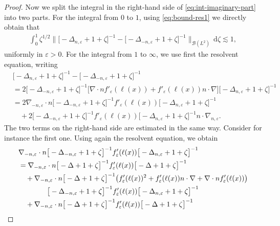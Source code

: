 \documentclass[12pt]{article}
\theoremstyle{plain}
\begin{document}
\begin{proof}
Now we split the integral in the right-hand side of \eqref{eq:int-imaginary-part} into two parts. For the integral from $0$ to $1$, using \eqref{eq:bound-res1} we directly obtain that
\begin{align}
    \int_0^1 \zeta^{1/2}\Big\|\big[-\Delta_{n,\varepsilon}+1+\zeta\big]^{-1}-\big[-\Delta_{- n,\varepsilon}+1+\zeta\big]^{-1}\Big\|_{\mathcal{B}(L^2)}\, \mathrm{d}\zeta \lesssim 1,
\end{align}
uniformly in $\varepsilon>0$. For the integral from $1$ to $\infty$, we use first the resolvent equation, writing
\begin{align}
    &\big[-\Delta_{ n,\varepsilon}+1+\zeta\big]^{-1}-\big[-\Delta_{- n,\varepsilon}+1+\zeta\big]^{-1}\nonumber\\
    &=2\big[-\Delta_{- n,\varepsilon}+1+\zeta\big]^{-1}\big[\nabla\cdot n f'_\varepsilon(\ell(x))+f'_\varepsilon(\ell(x))n\cdot\nabla\big]\big[-\Delta_{ n,\varepsilon}+1+\zeta\big]^{-1}\nonumber\\
    &=2\nabla_{-n,\varepsilon} \cdot n \big[-\Delta_{- n,\varepsilon}+1+\zeta\big]^{-1}f'_\varepsilon(\ell(x))\big[-\Delta_{n,\varepsilon}+1+\zeta\big]^{-1}\nonumber\\
    &\quad +2 \big[-\Delta_{- n,\varepsilon}+1+\zeta\big]^{-1}f'_\varepsilon(\ell(x))\big[-\Delta_{ n,\varepsilon}+1+\zeta\big]^{-1}n\cdot\nabla_{ n,\varepsilon}. \label{eq:once-resolv}
\end{align}
The two terms on the right-hand side are estimated in the same way. Consider for instance the first one. Using again the resolvent equation, we obtain
\begin{align}
    &\nabla_{- n,\varepsilon}\cdot n \big[-\Delta_{- n,\varepsilon}+1+\zeta\big]^{-1}f'_\varepsilon(\ell(x))\big[-\Delta_{ n,\varepsilon}+1+\zeta\big]^{-1}\notag\\
    &=\nabla_{- n,\varepsilon}\cdot n \big[-\Delta+1+\zeta\big]^{-1}f'_\varepsilon(\ell(x))\big[-\Delta+1+\zeta\big]^{-1}\notag\\
    &\quad+\nabla_{- n,\varepsilon}\cdot n\big[-\Delta+1+\zeta\big]^{-1}\big(f'_\varepsilon(\ell(x))^2+f'_\varepsilon(\ell(x))n\cdot\nabla+\nabla\cdot n f'_\varepsilon(\ell(x))\big)\notag\\
    &\qquad\qquad\big[-\Delta_{- n,\varepsilon}+1+\zeta\big]^{-1}f'_\varepsilon(\ell(x))\big[-\Delta_{ n,\varepsilon}+1+\zeta\big]^{-1}\notag\\
        &\quad+\nabla_{- n,\varepsilon}\cdot n\big[-\Delta+1+\zeta\big]^{-1}f'_\varepsilon(\ell(x))\big[-\Delta+1+\zeta\big]^{-1}\notag\\

\end{align}
\end{proof}
\end{document}
